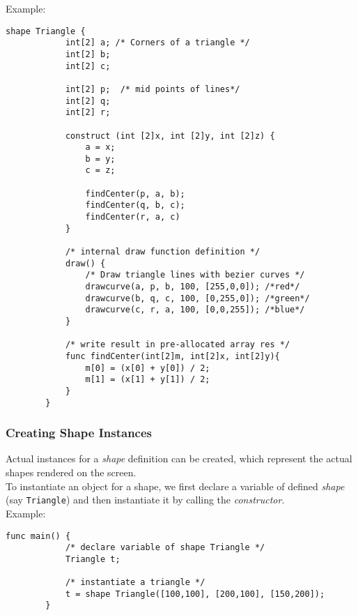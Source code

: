     Example:\\
    \begin{lstlisting}[style=sol]
        shape Triangle {
            int[2] a; /* Corners of a triangle */
            int[2] b;
            int[2] c;

            int[2] p;  /* mid points of lines*/
            int[2] q;
            int[2] r;

            construct (int [2]x, int [2]y, int [2]z) {
                a = x;
                b = y;
                c = z;

                findCenter(p, a, b);
                findCenter(q, b, c);
                findCenter(r, a, c)
            }

            /* internal draw function definition */
            draw() {
                /* Draw triangle lines with bezier curves */
                drawcurve(a, p, b, 100, [255,0,0]); /*red*/
                drawcurve(b, q, c, 100, [0,255,0]); /*green*/
                drawcurve(c, r, a, 100, [0,0,255]); /*blue*/
            }

            /* write result in pre-allocated array res */
            func findCenter(int[2]m, int[2]x, int[2]y){
                m[0] = (x[0] + y[0]) / 2;
                m[1] = (x[1] + y[1]) / 2;
            }
        }
    \end{lstlisting}

    \subsubsection{Creating Shape Instances}
    Actual instances for a \textit{shape} definition can be created, which represent the actual shapes rendered on the screen.\\
    To instantiate an object for a shape, we first declare a variable of defined \textit{shape} (say \texttt{Triangle}) and then instantiate it by calling the \textit{constructor}.\\
    Example:\\
    \begin{lstlisting}[style=sol]
        func main() {
            /* declare variable of shape Triangle */
            Triangle t; 

            /* instantiate a triangle */
            t = shape Triangle([100,100], [200,100], [150,200]); 
        }
    \end{lstlisting}
